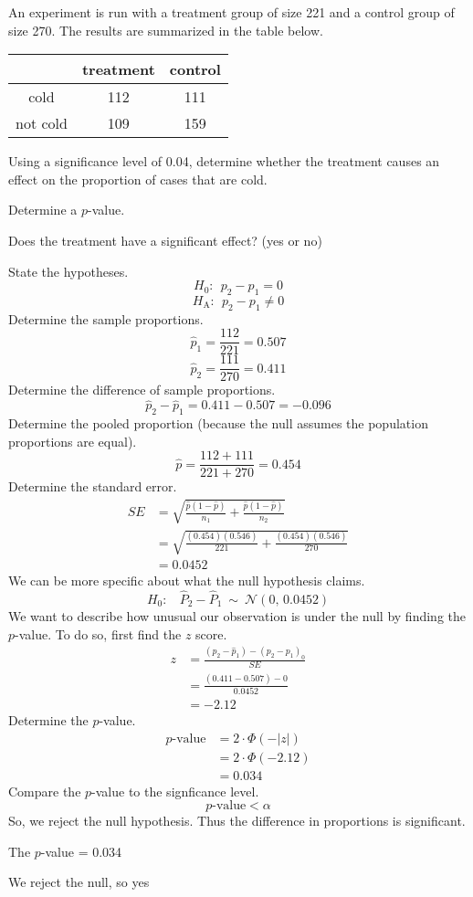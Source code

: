 
\begin{question}
An experiment is run with a treatment group of size 221 and a control
group of size 270. The results are summarized in the table below.

\begin{longtable}[c]{@{}ccc@{}}
\toprule
& treatment & control\tabularnewline
\midrule
\endhead
cold & 112 & 111\tabularnewline
not cold & 109 & 159\tabularnewline
\bottomrule
\end{longtable}

Using a significance level of 0.04, determine whether the treatment
causes an effect on the proportion of cases that are cold.
\begin{answerlist}
  \item Determine a \(p\)-value.
  \item Does the treatment have a significant effect? (yes or no)
\end{answerlist}
\end{question}

\begin{solution}
State the hypotheses. \[H_0:~~ p_2-p_1 = 0 \]
\[H_\text{A}: ~~ p_2-p_1 \ne 0 \] Determine the sample proportions.
\[\hat{p}_1 = \frac{112}{221} = 0.507 \]
\[\hat{p}_2 = \frac{111}{270} = 0.411 \] Determine the difference of
sample proportions. \[\hat{p}_2-\hat{p}_1 = 0.411-0.507 = -0.096 \]
Determine the pooled proportion (because the null assumes the population
proportions are equal). \[ \hat{p} = \frac{112+111}{221+270} = 0.454 \]
Determine the standard error. \[
\begin{aligned}
SE &= \sqrt{\frac{\hat{p}(1-\hat{p})}{n_1}+\frac{\hat{p}(1-\hat{p})}{n_2}} \\[1em]
&= \sqrt{\frac{(0.454)(0.546)}{221}+\frac{(0.454)(0.546)}{270}} \\[1em]
&= 0.0452
\end{aligned}
\] We can be more specific about what the null hypothesis claims.
\[H_0:~~~~ \hat{P}_2-\hat{P}_1 ~\sim~ \mathcal{N}(0,\,0.0452)\] We want
to describe how unusual our observation is under the null by finding the
\(p\)-value. To do so, first find the \(z\) score. \[
\begin{aligned}
z &= \frac{(\hat{p}_2-\hat{p}_1)-(p_2-p_1)_0}{SE}\\
&= \frac{(0.411-0.507)-0}{0.0452} \\
&= -2.12
\end{aligned}
\] Determine the \(p\)-value. \[
\begin{aligned}
p\text{-value} &= 2\cdot \Phi(-|z|)\\
&= 2\cdot \Phi(-2.12)\\
&= 0.034
\end{aligned}
\] Compare the \(p\)-value to the signficance level.
\[ p\text{-value} < \alpha \] So, we reject the null hypothesis. Thus
the difference in proportions is significant.
\begin{answerlist}
  \item The \(p\)-value = 0.034
  \item We reject the null, so yes
\end{answerlist}
\end{solution}

